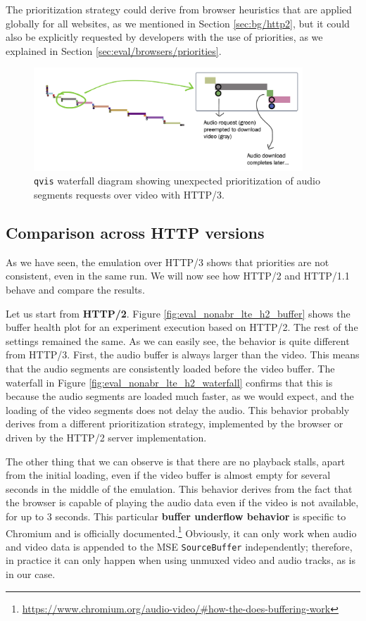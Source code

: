 The prioritization strategy could derive from browser heuristics that are applied globally for all websites, as we mentioned in Section \ref{sec:bg/http2}, but it could also be explicitly requested by developers with the use of priorities, as we explained in Section \ref{sec:eval/browsers/priorities}.

\begin{figure}[h]
    \centering
    \includegraphics[width=0.9\textwidth]{res/eval_nonabr_qvis2.png}
    \caption{\texttt{qvis} waterfall diagram showing unexpected prioritization of audio segments requests over video with HTTP/3.}
    \label{fig:eval_noabr_qvis2}
\end{figure}

\subsection{Comparison across HTTP versions}
\label{sec:eval/non-abr/http-versions}

As we have seen, the emulation over HTTP/3 shows that priorities are not consistent, even in the same run. We will now see how HTTP/2 and HTTP/1.1 behave and compare the results.

Let us start from \textbf{HTTP/2}. Figure \ref{fig:eval_nonabr_lte_h2_buffer} shows the buffer health plot for an experiment execution based on HTTP/2. The rest of the settings remained the same. As we can easily see, the behavior is quite different from HTTP/3. First, the audio buffer is always larger than the video. This means that the audio segments are consistently loaded before the video buffer. The waterfall in Figure \ref{fig:eval_nonabr_lte_h2_waterfall} confirms that this is because the audio segments are loaded much faster, as we would expect, and the loading of the video segments does not delay the audio. This behavior probably derives from a different prioritization strategy, implemented by the browser or driven by the HTTP/2 server implementation.

The other thing that we can observe is that there are no playback stalls, apart from the initial loading, even if the video buffer is almost empty for several seconds in the middle of the emulation. This behavior derives from the fact that the browser is capable of playing the audio data even if the video is not available, for up to 3 seconds. This particular \textbf{buffer underflow behavior} is specific to Chromium and is officially documented.\footnote{\url{https://www.chromium.org/audio-video/\#how-the-does-buffering-work}} Obviously, it can only work when audio and video data is appended to the MSE \texttt{SourceBuffer} independently; therefore, in practice it can only happen when using unmuxed video and audio tracks, as is in our case.

